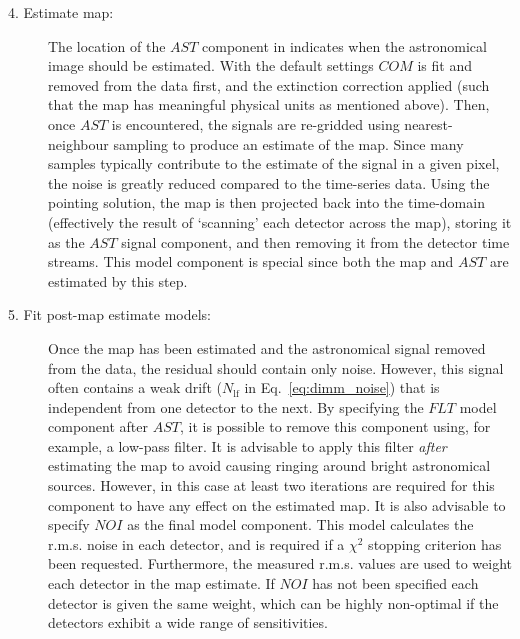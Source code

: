 \documentclass[oneside,11pt]{starlink}
\begin{document}
\begin{description}
\item[4. Estimate map:] The location of the $AST$ component in
   indicates when the astronomical image should be
  estimated. With the default settings $COM$ is fit and removed from
  the data first, and the extinction correction applied (such that the
  map has meaningful physical units as mentioned above). Then, once
  $AST$ is encountered, the signals are re-gridded using
  nearest-neighbour sampling to produce an estimate of the map. Since
  many samples typically contribute to the estimate of the signal in a
  given pixel, the noise is greatly reduced compared to the
  time-series data. Using the pointing solution, the map is then
  projected back into the time-domain (effectively the result of
  `scanning' each detector across the map), storing it as the $AST$
  signal component, and then removing it from the detector time
  streams. This model component is special since both the map and
  $AST$ are estimated by this step.

\item[5. Fit post-map estimate models:] Once the map has been
  estimated and the astronomical signal removed from the data, the
  residual should contain only noise. However, this signal often
  contains a weak drift ($N_{\textrm{lf}}$ in Eq.~\ref{eq:dimm_noise}) that
  is independent from one detector to the next. By specifying the
  $FLT$ model component after $AST$, it is possible to remove this
  component using, for example, a low-pass filter. It is advisable to
  apply this filter {\em after} estimating the map to avoid causing
  ringing around bright astronomical sources. However, in this case at
  least two iterations are required for this component to have any
  effect on the estimated map. It is also advisable to specify $NOI$
  as the final model component. This model calculates the r.m.s. noise
  in each detector, and is required if a $\chi^2$ stopping criterion
  has been requested. Furthermore, the measured r.m.s. values are used
  to weight each detector in the map estimate. If $NOI$ has not been
  specified each detector is given the same weight, which can be
  highly non-optimal if the detectors exhibit a wide range of
  sensitivities.


\end{description}
\end{document}
